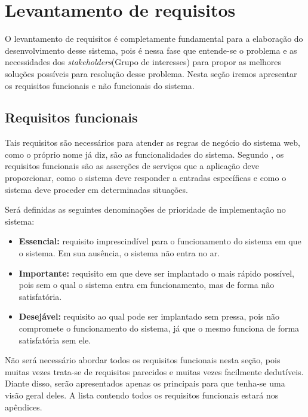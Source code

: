 \section{Levantamento de requisitos}\label{requisitos}

O levantamento de requisitos é completamente fundamental para a elaboração do desenvolvimento desse sistema, pois é nessa fase que entende-se o problema e as necessidades dos \textit{stakeholders}(Grupo de interesses) para propor as melhores soluções possíveis para resolução desse problema. Nesta seção iremos apresentar os requisitos funcionais e não funcionais do sistema.

\subsection{Requisitos funcionais}

Tais requisitos são necessários para atender as regras de negócio do sistema web, como o próprio nome já diz, são as funcionalidades do sistema.  Segundo \cite{sommerville2007engenharia}, os requisitos funcionais são as asserções de serviços que a aplicação deve proporcionar, como o sistema deve responder a entradas específicas e como o sistema deve proceder em determinadas situações. \par
Será definidas as seguintes denominações de prioridade de implementação no sistema:
\begin{itemize}  
\item \textbf{Essencial:} requisito imprescindível para o funcionamento do sistema em que o sistema. Em sua ausência, o sistema não entra no ar.
\item \textbf{Importante:} requisito em que deve ser implantado o mais rápido possível, pois sem o qual o sistema entra em funcionamento, mas de forma não satisfatória.
\item \textbf{Desejável:} requisito ao qual pode ser implantado sem pressa, pois não compromete o funcionamento do sistema, já que o mesmo funciona de forma satisfatória sem ele.
\end{itemize} \par
Não será necessário abordar todos os requisitos funcionais nesta seção, pois muitas vezes trata-se de requisitos parecidos e muitas vezes facilmente dedutíveis. Diante disso, serão apresentados apenas os principais para que tenha-se uma visão geral deles. A lista contendo todos os requisitos funcionais estará nos apêndices.

